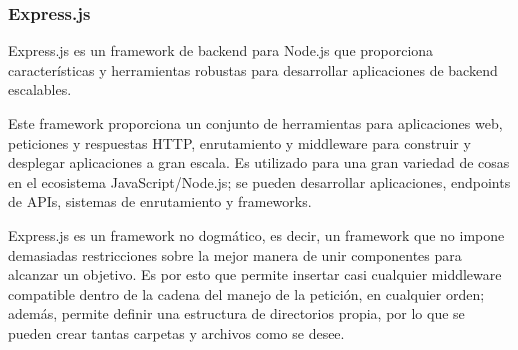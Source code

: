 \subsubsection{Express.js}
Express.js es un framework de backend para Node.js que proporciona características y herramientas robustas para desarrollar aplicaciones de backend escalables.

Este framework proporciona un conjunto de herramientas para aplicaciones web, peticiones y respuestas HTTP, enrutamiento y middleware para construir y desplegar aplicaciones a gran escala. Es utilizado para una gran variedad de cosas en el ecosistema JavaScript/Node.js; se pueden desarrollar aplicaciones, endpoints de APIs, sistemas de enrutamiento y frameworks.

Express.js es un framework no dogmático, es decir, un framework que no impone demasiadas restricciones sobre la mejor manera de unir componentes para alcanzar un objetivo. Es por esto que permite insertar casi cualquier middleware compatible dentro de la cadena del manejo de la petición, en cualquier orden; además, permite definir una estructura de directorios propia, por lo que se pueden crear tantas carpetas y archivos como se desee. 